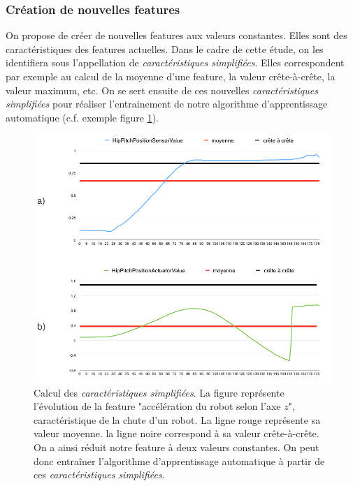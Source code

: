 \subsubsection{Création de nouvelles features}
\label{Automatisation du processus d'investigation: Reconnaissance de motifs: Différentes approches étudiées: Création de nouvelles features}
On propose de créer de nouvelles features aux valeurs constantes. Elles sont des caractéristiques des features actuelles. Dans le cadre de cette étude, on les identifiera sous l'appellation de \emph{caractéristiques simplifiées}. Elles correspondent par exemple au calcul de la moyenne d'une feature, la valeur crête-à-crête, la valeur maximum, etc. On se sert ensuite de ces nouvelles \emph{caractéristiques simplifiées} pour réaliser l'entrainement de notre algorithme d'apprentissage automatique (c.f. exemple figure \ref{fig:Calcul de nouvelles features}).

\begin{figure}[h]
	\centering\includegraphics[width=12cm]{images/caracteristiques_simples_1.png}
	\caption[Calcul des caractéristiques simplifiées]{Calcul des \emph{caractéristiques simplifiées}. La figure représente l'évolution de la feature "accélération du robot selon l'axe $z$",  caractéristique de la chute d'un robot. La ligne rouge représente sa valeur moyenne. la ligne noire correspond à sa valeur crête-à-crête. On a ainsi réduit notre feature à deux valeurs constantes. On peut donc entraîner l'algorithme d'apprentissage automatique à partir de ces \emph{caractéristiques simplifiées}.}
	\label{fig:Calcul de nouvelles features}
\end{figure}

